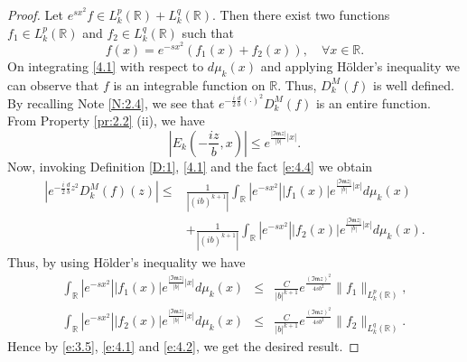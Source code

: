 \documentclass[12pt,a4paper,reqno]{amsproc}
\theoremstyle{definition}
\theoremstyle{remark}
\numberwithin{equation}{section}
\begin{document}
\begin{proof}
Let $e^{sx^2} f\in L_k^p(\mathbb{R})+L_k^{q}(\mathbb{R})$. Then there exist two functions $f_1\in L_k^p(\mathbb{R})$ and $f_2\in L_k^{q}(\mathbb{R})$ such that 
\begin{equation}\label{4.1}
f(x)=e^{-sx^2}(f_1(x)+f_2(x)), \quad \forall x \in \mathbb{R}.   
\end{equation}
On integrating \eqref{4.1} with respect to  $ d\mu_k(x)$ and applying H\"older's inequality we can observe that  $f$ is an integrable function on $\mathbb{R}$. Thus, $D_k^M(f)$ is well defined. By recalling Note \ref{N:2.4}, we see that    $e^ {-\frac{i}{2}\frac{d}{b}(\cdot)^2}D_k^M(f)$ is an entire function. From Property \ref{pr:2.2} (ii), we have
 \begin{equation} \label{e:4.4}
\left|E_k\left(-\frac{iz}{b},x\right)\right| \le e^{\frac{|\mathfrak{Im}z|}{|b|}|x|}.
\end{equation}
Now, invoking  Definition \ref{D:1}, \eqref{4.1} and the fact \eqref{e:4.4} we obtain
\begin{eqnarray} \label{e:3.5}
 \nonumber    |e^{-\frac{i}{2}\frac{d}{b}z^2} D_k^M(f)(z)| 
  \le&\frac{1}{|(ib)^{k+1}|}  \int_{\mathbb{R}} |e^{-sx^2}| | f_1(x)| e^{\frac{|\mathfrak{Im}z|}{|b|}|x|} d\mu_k(x)\\
  &+\frac{1}{|(ib)^{k+1}|}\int_{\mathbb{R}} |e^{-sx^2}| | f_2(x)| e^{\frac{|\mathfrak{Im}z|}{|b|}|x|} d\mu_k(x).
 \end{eqnarray}
Thus, by using H\"older's  inequality we have
 \begin{eqnarray}
 \int_{\mathbb{R}} |e^{-sx^2}| | f_1(x)| e^{\frac{|\mathfrak{Im}z|}{|b|}|x|} d\mu_k(x) &\le& \frac{C}{|b|^{k+1}} e^{\frac{(\mathfrak{Im}z)^2}{4sb^2}} \|f_1\|_{L_k^p(\mathbb{R})}, \label{e:4.1}\\
 \int_{\mathbb{R}} |e^{-sx^2}| | f_2(x)| e^{\frac{|\mathfrak{Im}z|}{|b|}|x|} d\mu_k(x) &\le& \frac{C}{|b|^{k+1}} e^{\frac{(\mathfrak{Im}z)^2}{4sb^2}} \|f_2\|_{L_k^{q}(\mathbb{R})} \label{e:4.2}.
 \end{eqnarray}
Hence by \eqref{e:3.5}, \eqref{e:4.1} and \eqref{e:4.2}, we get the desired result.
\end{proof}
\end{document}
